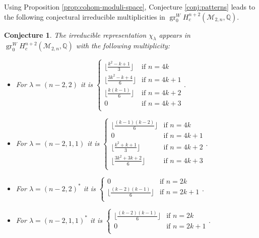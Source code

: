 \documentclass[12pt]{article}
\newcommand{\Q}{\mathbb{Q}}
\newcommand{\Specht}[1]{\chi_{#1}}
\newcommand{\TransposePartition}[1]{{#1}^{\ast}}
\newcommand{\ModuliCurve}[1]{\mathcal{M}_{#1}}
\DeclareMathOperator{\gr}{gr}
\theoremstyle{plain}
\newtheorem{conj}[thm]{Conjecture}
\theoremstyle{definition}
\theoremstyle{remark}
\begin{document}
Using Proposition \ref{prop:cohom-moduli-space}, Conjecture \ref{conj:patterns} leads to the following conjectural irreducible multiplicities in $\gr_0^W H_c^{n+2}(\ModuliCurve{2, n}, \Q)$.

\begin{conj}\label{conj:patterns-M2n}
    The irreducible representation $\Specht{\lambda}$ appears in $\gr_0^W H_c^{n+2}(\ModuliCurve{2,n}, \Q)$ with the following multiplicity:
    \begin{itemize}
        \item For $\lambda = (n-2,2)$ it is $\begin{cases}
            \lfloor \frac{k^2-k+1}{3}\rfloor & \text{if } n = 4k \\
            \lfloor \frac{3k^2-k+4}{6}\rfloor & \text{if } n = 4k+1 \\
            \lfloor \frac{k(k-1)}{6}\rfloor & \text{if } n = 4k+2 \\
            0 & \text{if } n = 4k+3 \\
        \end{cases}.$
        \item For $\lambda = (n-2,1,1)$ it is $\begin{cases}
            \lfloor \frac{(k-1)(k-2)}{6}\rfloor & \text{if } n = 4k \\
            0 & \text{if } n = 4k+1 \\
            \lfloor \frac{k^2+k+1}{3}\rfloor & \text{if } n = 4k+2 \\
            \lfloor \frac{3k^2+3k+2}{6}\rfloor & \text{if } n = 4k+3 \\
        \end{cases}.$
        \item For $\lambda = \TransposePartition{(n-2,2)}$ it is $\begin{cases}
            0 & \text{if } n = 2k \\
            \lfloor \frac{(k-2)(k-1)}{6}\rfloor & \text{if } n = 2k + 1\\
        \end{cases}.$
        \item For $\lambda = \TransposePartition{(n-2,1,1)}$ it is $\begin{cases}
            \lfloor \frac{(k-2)(k-1)}{6}\rfloor & \text{if } n = 2k \\
            0 & \text{if } n = 2k+1 \\
        \end{cases}.$
    \end{itemize}
\end{conj}
\end{document}
